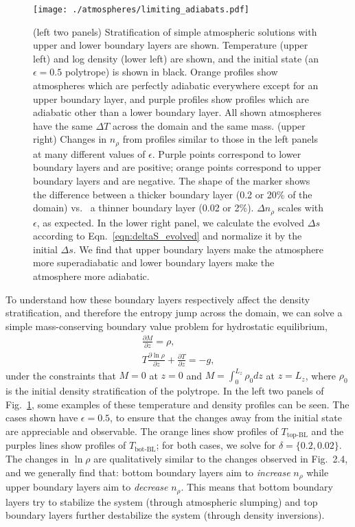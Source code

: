 \documentclass[aps, pre, onecolumn, nofootinbib, notitlepage, groupedaddress, amsfonts, amssymb, amsmath, longbibliography, superscriptaddress]{revtex4-1}
\begin{document}
\begin{figure}[t!]
\texttt{[image: ./atmospheres/limiting\_adiabats.pdf]}
\caption{ (left two panels) Stratification of simple atmospheric solutions with upper and lower boundary layers are shown.
		  Temperature (upper left) and log density (lower left) are shown, and the initial state (an $\epsilon = 0.5$ polytrope) is shown in black.
		  Orange profiles show atmospheres which are perfectly adiabatic everywhere except for an upper boundary layer, and purple profiles show profiles which are adiabatic other than a lower boundary layer.
		  All shown atmospheres have the same $\Delta T$ across the domain and the same mass.
		  (upper right) Changes in $n_\rho$ from profiles similar to those in the left panels at many different values of $\epsilon$.
		  Purple points correspond to lower boundary layers and are positive; orange points correspond to upper boundary layers and are negative.
		  The shape of the marker shows the difference between a thicker boundary layer (0.2 or 20\% of the domain) vs.~ a thinner boundary layer (0.02 or 2\%).
		  $\Delta n_\rho$ scales with $\epsilon$, as expected.
		  In the lower right panel, we calculate the evolved $\Delta s$ according to Eqn.~\ref{eqn:deltaS_evolved} and normalize it by the initial $\Delta s$.
		  We find that upper boundary layers make the atmosphere more superadiabatic and lower boundary layers make the atmosphere more adiabatic.
	\label{fig:limiting_adiabats} }
\end{figure}




To understand how these boundary layers respectively affect the density stratification, and therefore the entropy jump across the domain, we can solve a simple mass-conserving boundary value problem for hydrostatic equilibrium, 
\begin{equation}
\begin{split}
\frac{\partial M}{\partial z} = \rho,\\
T\frac{\partial \ln\rho}{\partial z} + \frac{\partial T}{\partial z} = -g,
\end{split}
\end{equation}
under the constraints that $M = 0$ at $z = 0$ and $M = \int_0^{L_z} \rho_0 dz$ at $z = L_z$, where $\rho_0$ is the initial density stratification of the polytrope.
In the left two panels of Fig.~\ref{fig:limiting_adiabats}, some examples of these temperature and density profiles can be seen.
The cases shown have $\epsilon = 0.5$, to ensure that the changes away from the initial state are appreciable and observable.
The orange lines show profiles of $T_{\text{top-BL}}$ and the purples lines show profiles of $T_{\text{bot-BL}}$; for both cases, we solve for $\delta = \{0.2, 0.02\}$.
The changes in $\ln\rho$ are qualitatively similar to the changes observed in Fig.~2.4, and we generally find that: bottom boundary layers aim to \emph{increase} $n_\rho$ while upper boundary layers aim to \emph{decrease} $n_\rho$.
This means that bottom boundary layers try to stabilize the system (through atmospheric slumping) and top boundary layers further destabilize the system (through density inversions).
\end{document}
